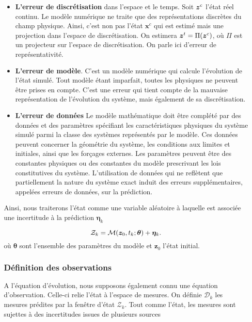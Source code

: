 \begin{itemize}
    \item \textbf{L'erreur de discrétisation} dans l'espace et le temps. Soit $\bm z^c$ l'état réel continu. Le modèle numérique ne traite que des représentations discrètes du champ physique. Ainsi, c'est non pas l'état $\bm x^c$ qui est estimé mais une projection dans l'espace de discrétisation. On estimera $\bm z^t = \Pi(\bm z^c)$, où $\Pi$ est un projecteur sur l'espace de discrétisation. On parle ici d'erreur de représentativité.
    \item \textbf{L'erreur de modèle}. C'est un modèle numérique qui calcule l'évolution de l'état simulé. Tout modèle étant imparfait, toutes les physiques ne peuvent être prises en compte. C'est une erreur qui tient compte de la mauvaise représentation de l'évolution du système, mais également de sa discrétisation.
    \item \textbf{L'erreur de données} Le modèle mathématique doit être complété par des données et des paramètres spécifiant les caractéristiques physiques du système simulé parmi la classe des systèmes représentés par le modèle. Ces données peuvent concerner la géométrie du système, les conditions aux limites et initiales, ainsi que les forçages externes. Les paramètres peuvent être des constantes physiques ou des constantes du modèle prescrivant les lois constitutives du système. L'utilisation de données qui ne reflètent que partiellement la nature du système exact induit des erreurs supplémentaires, appelées erreurs de données, sur la prédiction.
\end{itemize}

Ainsi, nous traiterons l'état comme une variable aléatoire à laquelle est associée une incertitude à la prédiction $\bm \eta_k$

\begin{equation*}
    \mathcal Z_k = \mathcal{M}(\bm z_0, t_k ; \bm \theta) + \bm \eta_k.
\end{equation*}
où $\bm \theta$ sont l'ensemble des paramètres du modèle et $\bm z_0$ l'état initial.

\subsubsection{Définition des observations}
A l'équation d'évolution, nous supposons également connu une équation d'observation. Celle-ci relie l'état à l'espace de mesures. On définie $\mathcal{D}_k$ les mesures prédites par la fenêtre d'état $\mathcal{Z}_k$. Tout comme l'état, les mesures sont sujettes à des incertitudes issues de plusieurs sources


